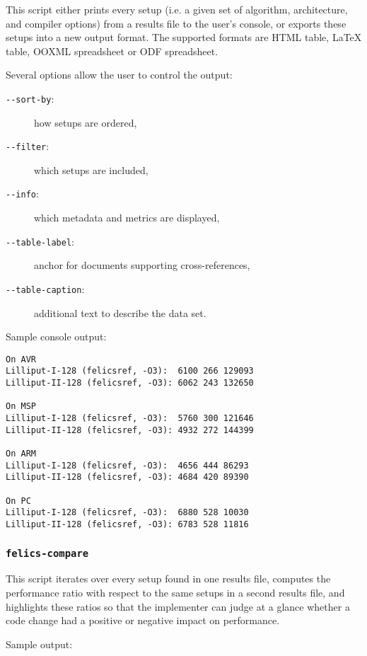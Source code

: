 \documentclass{article}
\begin{document}
This script either prints every setup (i.e. a given set of algorithm,
architecture, and compiler options) from a results file to the user's
console, or exports these setups into a new output format.  The
supported formats are HTML table, \LaTeX{} table, OOXML spreadsheet or
ODF spreadsheet.

Several options allow the user to control the output:

\begin{description}
\item[\texttt{-{}-sort-by}:] how setups are ordered,
\item[\texttt{-{}-filter}:] which setups are included,
\item[\texttt{-{}-info}:] which metadata and metrics are displayed,
\item[\texttt{-{}-table-label}:] anchor for documents supporting
  cross-references,
\item[\texttt{-{}-table-caption}:] additional text to describe the
  data set.
\end{description}

Sample console output:

\begin{verbatim}
On AVR
Lilliput-I-128 (felicsref, -O3):  6100 266 129093
Lilliput-II-128 (felicsref, -O3): 6062 243 132650

On MSP
Lilliput-I-128 (felicsref, -O3):  5760 300 121646
Lilliput-II-128 (felicsref, -O3): 4932 272 144399

On ARM
Lilliput-I-128 (felicsref, -O3):  4656 444 86293
Lilliput-II-128 (felicsref, -O3): 4684 420 89390

On PC
Lilliput-I-128 (felicsref, -O3):  6880 528 10030
Lilliput-II-128 (felicsref, -O3): 6783 528 11816
\end{verbatim}

\subsubsection{\texttt{felics-compare}}

This script iterates over every setup found in one results file,
computes the performance ratio with respect to the same setups in a
second results file, and highlights these ratios so that the
implementer can judge at a glance whether a code change had a positive
or negative impact on performance.

Sample output:
\end{document}

